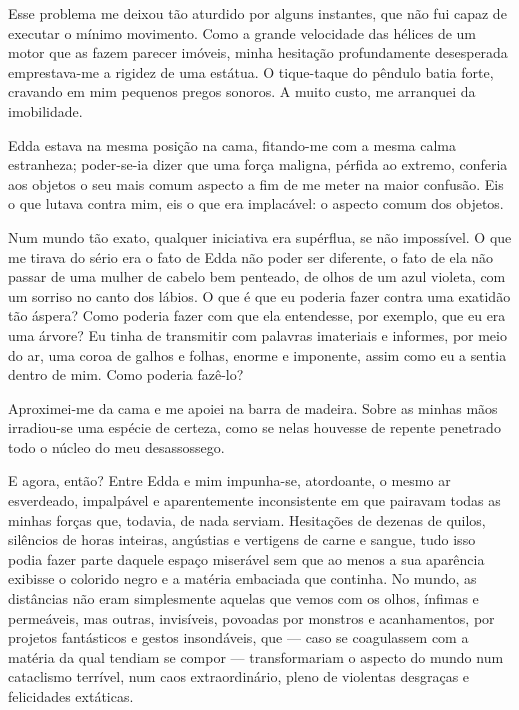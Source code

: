 Esse problema me deixou tão aturdido por alguns instantes, que não fui capaz de executar o mínimo movimento. Como a grande velocidade das hélices de um motor que as fazem parecer imóveis, minha hesitação profundamente desesperada emprestava-me a rigidez de uma estátua. O tique-taque do pêndulo batia forte, cravando em mim pequenos pregos sonoros. A muito custo, me arranquei da imobilidade. 

Edda estava na mesma posição na cama, fitando-me com a mesma calma estranheza; poder-se-ia dizer que uma força maligna, pérfida ao extremo, conferia aos objetos o seu mais comum aspecto a fim de me meter na maior confusão. Eis o que lutava contra mim, eis o que era implacável: o aspecto comum dos objetos.

Num mundo tão exato, qualquer iniciativa era supérflua, se não impossível. O que me tirava do sério era o fato de Edda não poder ser diferente, o fato de ela não passar de uma mulher de cabelo bem penteado, de olhos de um azul violeta, com um sorriso no canto dos lábios. O que é que eu poderia fazer contra uma exatidão tão áspera? Como poderia fazer com que ela entendesse, por exemplo, que eu era uma árvore? Eu tinha de transmitir com palavras imateriais e informes, por meio do ar, uma coroa de galhos e folhas, enorme e imponente, assim como eu a sentia dentro de mim. Como poderia fazê-lo?

Aproximei-me da cama e me apoiei na barra de madeira. Sobre as minhas mãos irradiou-se uma espécie de certeza, como se nelas houvesse de repente penetrado todo o núcleo do meu desassossego.

E agora, então? Entre Edda e mim impunha-se, atordoante, o mesmo ar esverdeado, impalpável e aparentemente inconsistente em que pairavam todas as minhas forças que, todavia, de nada serviam. Hesitações de dezenas de quilos, silêncios de horas inteiras, angústias e vertigens de carne e sangue, tudo isso podia fazer parte daquele espaço miserável sem que ao menos a sua aparência exibisse o colorido negro e a matéria embaciada que continha. No mundo, as distâncias não eram simplesmente aquelas que vemos com os olhos, ínfimas e permeáveis, mas outras, invisíveis, povoadas por monstros e acanhamentos, por projetos fantásticos e gestos insondáveis, que --- caso se coagulassem com a matéria da qual tendiam se compor --- transformariam o aspecto do mundo num cataclismo terrível, num caos extraordinário, pleno de violentas desgraças e felicidades extáticas.

